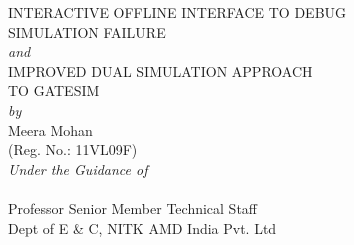 \documentclass[a4paper,12pt]{report}
\begin{document}
\begin{titlepage}
\begin{center}
{\Large INTERACTIVE OFFLINE INTERFACE TO DEBUG}\\
\vspace{3.5pt}
{\Large SIMULATION FAILURE}\\
\vspace{7pt}
{\emph{and}}\\
\vspace{7pt}
{\Large IMPROVED DUAL SIMULATION APPROACH}\\
\vspace{3.5pt}
{\Large TO GATESIM}\\

\vspace{15pt}
\textit {by} \\
\vspace{10pt}
{\Large {Meera Mohan}}\\ 
{(Reg. No.: 11VL09F)}\\
\vspace{15pt}
{\em Under the Guidance of} \\
\vspace{10pt}
 \\
\hspace{-0.05in} Professor \hspace{2in} Senior Member Technical Staff\\
\hspace{-0.45in}Dept of E \& C, NITK \hspace{1.65in} AMD India Pvt. Ltd\\

\vspace{-0.05in}
\begin{table}[H]
   \hspace{.3in}  \begin{tabular}{ccc}	
	 			

\end{tabular}
\end{table}
\end{center}
\end{titlepage}
\end{document}
